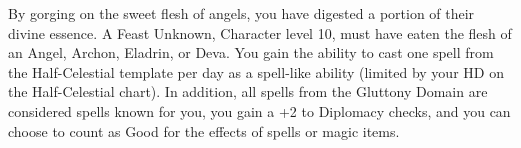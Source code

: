 \shortdescfeat
{By gorging on the sweet flesh of angels, you have digested a portion of their divine essence.}
{A Feast Unknown, Character level 10, must have eaten the flesh of an Angel, Archon, Eladrin, or Deva.}
{You gain the ability to cast one spell from the Half-Celestial template per day as a spell-like ability (limited by your HD on the Half-Celestial chart). In addition, all spells from the Gluttony Domain are considered spells known for you, you gain a +2 to Diplomacy checks, and you can choose to count as Good for the effects of spells or magic items.}

